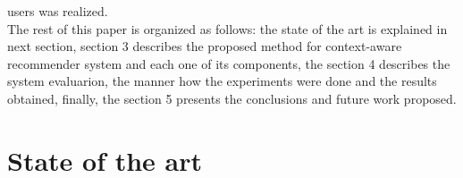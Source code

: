 users was realized. \\
The rest of this paper is organized as follows: the state of the art
is explained in next section,  section 3 describes the proposed method
for context-aware recommender system and each one of its components,
the section 4 describes the system evaluarion, the manner how the 
experiments were done and the results obtained, finally, the section 
5 presents the conclusions and future work proposed.

\section{State of the art} \label{sec:2} 

